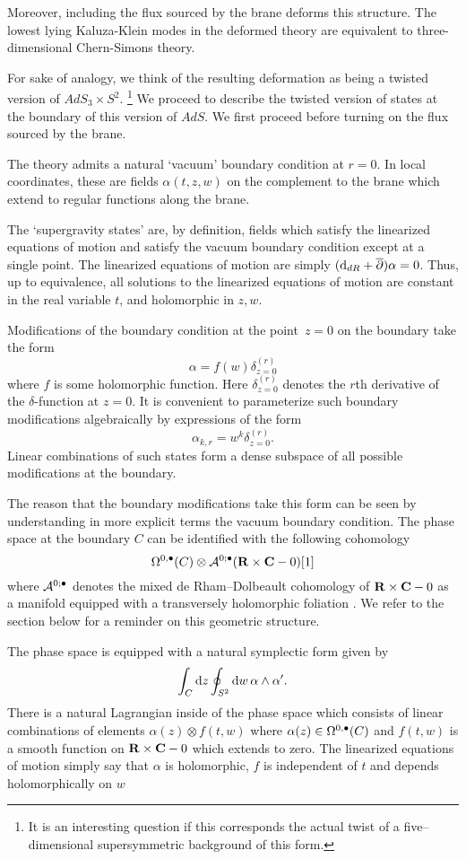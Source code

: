 Moreover, including the flux sourced by the brane deforms this structure. The lowest lying Kaluza-Klein modes in the deformed theory are equivalent to three-dimensional Chern-Simons theory.

For sake of analogy, we think of the resulting deformation as being a twisted version of $AdS_3 \times S^2$. \footnote{It is an interesting question if this corresponds the actual twist of a five--dimensional supersymmetric background of this form.}
We proceed to describe the twisted version of states at the boundary of this version of $AdS$.
We first proceed before turning on the flux sourced by the brane.

The theory admits a natural `vacuum' boundary condition at $r=0$.
In local coordinates, these are fields $\alpha(t,z,w)$ on the complement to the brane which extend to regular functions along the brane.

The `supergravity states' are, by definition, fields which satisfy the linearized equations of motion and satisfy the vacuum boundary condition except at a single point.
The linearized equations of motion are simply $({\rm d}_{dR} + \overline{\partial}) \alpha = 0$.
Thus, up to equivalence, all solutions to the linearized equations of motion are constant in the real variable $t$, and holomorphic in $z,w$.

Modifications of the boundary condition at the point~$z = 0$ on the boundary take the form
\[
\alpha = f(w) \delta^{(r)}_{z=0}
\]
where $f$ is some holomorphic function.
Here $\delta^{(r)}_{z=0}$ denotes the $r$th derivative of the $\delta$-function at $z=0$.
It is convenient to parameterize such boundary modifications algebraically by expressions of the form
\[
\alpha_{k,r} = w^k \delta^{(r)}_{z=0} .
\]
Linear combinations of such states form a dense subspace of all possible modifications at the boundary.

The reason that the boundary modifications take this form can be seen by understanding in more explicit terms the vacuum boundary condition.
The phase space at the boundary $C$ can be identified with the following cohomology
\[
\Omega^{0,\bullet}(C) \otimes \mathcal A^{0;\bullet}(\mathbf{R} \times \mathbf{C} - 0) [1]
\]
where $\mathcal A^{0;\bullet}$ denotes the mixed de Rham--Dolbeault cohomology of $\mathbf{R} \times \mathbf{C} - 0$ as a manifold equipped with a transversely holomorphic foliation \cite{DuchampKalka}.
We refer to the section below for a reminder on this geometric structure.

The phase space is equipped with a natural symplectic form given by
\[
\int_C {\rm d} z \oint_{S^2} {\rm d} w \, \alpha \wedge \alpha' .
\]
There is a natural Lagrangian inside of the phase space which consists of linear combinations of elements $\alpha(z) \otimes f(t,w)$ where $\alpha(z) \in \Omega^{0,\bullet}(C)$ and $f(t,w)$ is a smooth function on $\mathbf{R} \times \mathbf{C} - 0$ which extends to zero.
The linearized equations of motion simply say that $\alpha$ is holomorphic, $f$ is independent of $t$ and depends holomorphically on $w$

